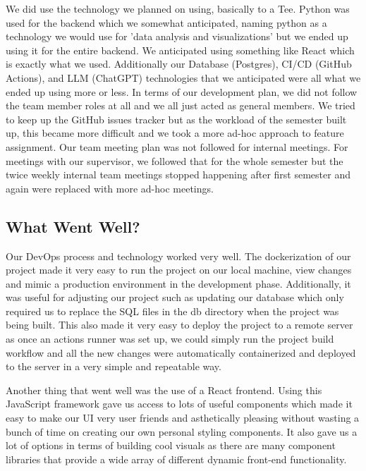 \documentclass{article}
\begin{document}
\par{We did use the technology we planned on using, basically to a Tee. Python was used for the backend which we somewhat anticipated,
naming python as a technology we would use for 'data analysis and visualizations' but we ended up using it for the entire backend. We anticipated using something like
React which is exactly what we used. Additionally our Database (Postgres), CI/CD (GitHub Actions),
and LLM (ChatGPT) technologies that we anticipated were all what we ended up using more or less.
In terms of our development plan, we did not follow the team member roles at all and we all just acted as general members. We tried to keep up the 
GitHub issues tracker but as the workload of the semester built up, this became more difficult and we took a more ad-hoc approach to feature assignment. Our team
meeting plan was not followed for internal meetings. For meetings with our supervisor, we followed that for the whole semester but the twice weekly internal
team meetings stopped happening after first semester and again were replaced with more ad-hoc meetings. }

\subsection{What Went Well?}

\par{Our DevOps process and technology worked very well. The dockerization of our project made it very easy to run the project on our local machine,
view changes and mimic a production environment in the development phase. Additionally, it was useful for adjusting our project such as updating
our database which only required us to replace the SQL files in the db directory when the project was being built. This also made it very easy to deploy the project
to a remote server as once an actions runner was set up, we could simply run the project build workflow and all the new changes were automatically containerized
and deployed to the server in a very simple and repeatable way.}
\par{Another thing that went well was the use of a React frontend. Using this JavaScript framework gave us access to lots of useful components which made it easy to make
our UI very user friends and asthetically pleasing without wasting a bunch of time on creating our own personal styling components. It also gave us a lot of options in terms of 
building cool visuals as there are many component libraries that provide a wide array of different dynamic front-end functionality.}
\end{document}
